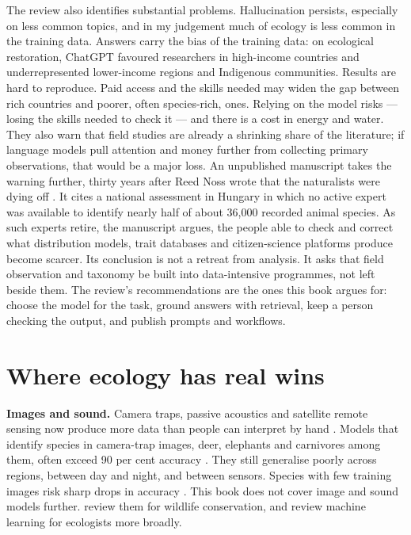 The review also identifies substantial problems. Hallucination persists,
especially on less common topics, and in my judgement much of ecology is less
common in the training data. Answers carry the bias of the training
data: on ecological restoration, ChatGPT favoured researchers in high-income
countries and underrepresented lower-income regions and Indigenous communities.
Results are hard to reproduce. Paid access and the skills needed may widen the
gap between rich countries and poorer, often species-rich, ones. Relying on the
model risks  --- losing the skills needed to check it --- and
there is a cost in energy and water. They also warn that field studies are
already a shrinking share of the literature; if language models pull attention
and money further from collecting primary observations, that would be a major
loss. An unpublished manuscript takes the warning further, thirty years
after Reed Noss wrote that the naturalists were dying off
\parencite{sun2026naturalists}. It cites a national assessment in Hungary in which no active expert
was available to identify nearly half of about 36{,}000 recorded animal
species. As such experts retire, the manuscript argues, the people able to
check and correct what distribution models, trait databases and
citizen-science platforms produce become scarcer. Its conclusion is not a
retreat from analysis. It asks that field observation and taxonomy be built
into data-intensive programmes, not left beside them. The review's
recommendations are the ones this book argues for: choose the model for
the task, ground answers with retrieval, keep a person checking the output, and
publish prompts and workflows.

\section{Where ecology has real wins}

\textbf{Images and sound.} Camera traps, passive acoustics and satellite remote
sensing now produce more data than people can interpret by hand
\parencite{roff2026shape}. Models that identify species in camera-trap images,
deer, elephants and carnivores among them, often exceed 90 per cent accuracy
\parencite{mishra2026notready}. They still generalise poorly across regions,
between day and night, and between sensors. Species with few training images
risk sharp drops in accuracy \parencite{tuia2022perspectives}. This book does
not cover image and sound models further. \textcite{tuia2022perspectives} review
them for wildlife conservation, and \textcite{pichler2023review} review machine
learning for ecologists more broadly.

